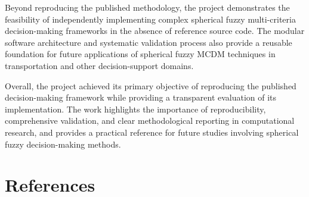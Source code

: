 \documentclass[11pt]{article}
\begin{document}
Beyond reproducing the published methodology, the project demonstrates the feasibility of independently implementing complex spherical fuzzy multi-criteria decision-making frameworks in the absence of reference source code. The modular software architecture and systematic validation process also provide a reusable foundation for future applications of spherical fuzzy MCDM techniques in transportation and other decision-support domains.

Overall, the project achieved its primary objective of reproducing the published decision-making framework while providing a transparent evaluation of its implementation. The work highlights the importance of reproducibility, comprehensive validation, and clear methodological reporting in computational research, and provides a practical reference for future studies involving spherical fuzzy decision-making methods.

\section{References}

\printbibliography[heading=none]
\end{document}
